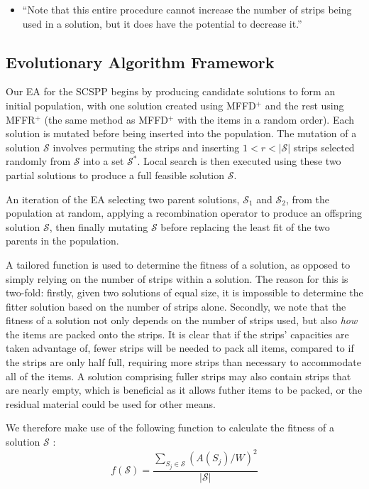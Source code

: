 \documentclass{elsarticle}
\begin{document}
{\color{myRed}
\begin{itemize}[leftmargin=*]
	\item ``Note that this entire procedure cannot increase the number of strips being used in a solution, but it does have the potential to decrease it.''
\end{itemize}
}

\subsection{Evolutionary Algorithm Framework}
\label{sub:eaframework}
\noindent Our EA for the SCSPP begins by producing candidate solutions to form an initial population, with one solution created using MFFD$^+$ and the rest using MFFR$^+$ (the same method as MFFD$^+$ with the items in a random order). Each solution is mutated before being inserted into the population. The mutation of a solution $\mathcal{S}$ involves permuting the strips and inserting $1 < r < |\mathcal{S}|$ strips selected randomly from $\mathcal{S}$ into a set $\mathcal{S}^*$. Local search is then executed using these two partial solutions to produce a full feasible solution $\mathcal{S}$. 

An iteration of the EA  selecting two parent solutions, $\mathcal{S}_1$ and $\mathcal{S}_2$, from the population at random, applying a recombination operator to produce an offspring solution $\mathcal{S}$, then finally mutating $\mathcal{S}$ before replacing the least fit of the two parents in the population.

A tailored function is used to determine the fitness of a solution, as opposed to simply relying on the number of strips within a solution. The reason for this is two-fold: firstly, given two solutions of equal size, it is impossible to determine the fitter solution based on the number of strips alone. Secondly, we note that the fitness of a solution not only depends on the number of strips used, but also \emph{how} the items are packed onto the strips. It is clear that if the strips' capacities are taken advantage of, fewer strips will be needed to pack all items, compared to if the strips are only half full, requiring more strips than necessary to accommodate all of the items. A solution comprising fuller strips may also contain strips that are nearly empty, which is beneficial as it allows futher items to be packed, or the residual material could be used for other means. 

We therefore make use of the following function to calculate the fitness of a solution $\mathcal{S}$ \cite{falkenauer1992}:
\begin{equation}
	f(\mathcal{S}) = \frac{\sum_{S_j \in \mathcal{S}} (A(S_j)/W)^2}{|\mathcal{S}|}
\end{equation}
\end{document}
